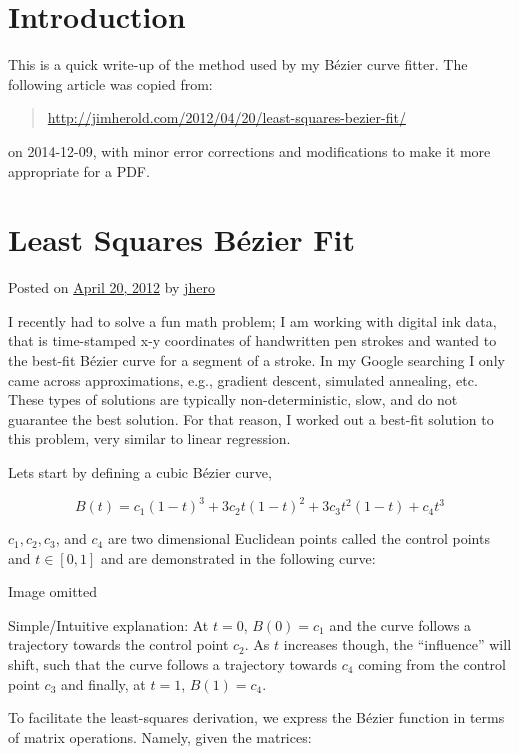 \documentclass{article}
\begin{document}
\section{Introduction}

This is a quick write-up of the method used by my B\'ezier curve fitter.  The following article was copied from:
\begin{quote}
  \url{http://jimherold.com/2012/04/20/least-squares-bezier-fit/}
\end{quote}
on 2014-12-09, with minor error corrections and modifications to make it more appropriate for a PDF.

\section{Least Squares B\'ezier Fit}

Posted on \href{http://jimherold.com/2012/04/20/least-squares-bezier-fit/}{April 20, 2012} by \href{jimherold.com/author/jhero}{jhero}

I recently had to solve a fun math problem; I am working with digital ink data, that is time-stamped x-y coordinates of handwritten pen strokes and wanted to the best-fit B\'ezier curve for a segment of a stroke. In my Google searching I only came across approximations, e.g., gradient descent, simulated annealing, etc. These types of solutions are typically non-deterministic, slow, and do not guarantee the best solution. For that reason, I worked out a best-fit solution to this problem, very similar to linear regression.

Lets start by defining a cubic B\'ezier curve,

\[B(t)=c_1(1-t)^3+3c_2t(1-t)^2+3c_3t^2(1-t)+c_4t^3\]

$c_1, c_2, c_3$, and $c_4$ are two dimensional Euclidean points called the control points and $t\in[0,1]$ and are demonstrated in the following curve:

\begin{center}
  \large
  Image omitted
\end{center}

Simple/Intuitive explanation: At $t=0$, $B(0)=c_1$ and the curve follows a trajectory towards the control point $c_2$. As $t$ increases though, the ``influence'' will shift, such that the curve follows a trajectory towards $c_4$ coming from the control point $c_3$ and finally, at $t=1$, $B(1)=c_4$.

To facilitate the least-squares derivation, we express the B\'ezier function in terms of matrix operations. Namely, given the matrices:
\end{document}
